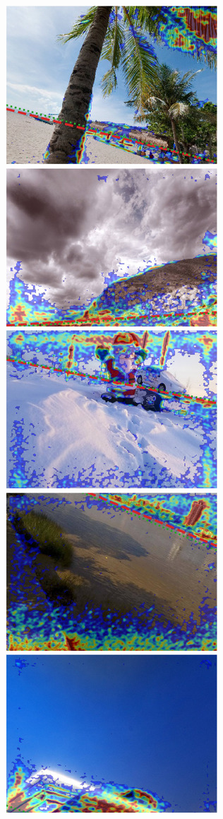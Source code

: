 \includegraphics{sgbp/thumb/pano_addtdiecjavkue-3.jpg}
\includegraphics{sgbp/thumb/pano_addtfngrqwwyvb-6.jpg}
\includegraphics{sgbp/thumb/pano_addtwdtklktubg-3.jpg}
\includegraphics{sgbp/thumb/pano_adqwuqgahcnffm-0.jpg}
\includegraphics{sgbp/thumb/pano_ayflzrhzcccird-0.jpg}
